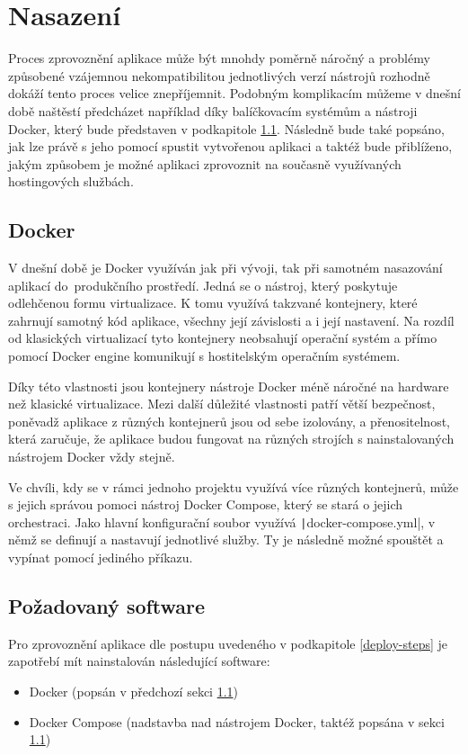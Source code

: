 \chapter{Nasazení}
Proces zprovoznění aplikace může být mnohdy poměrně náročný a problémy způsobené vzájemnou nekompatibilitou jednotlivých verzí nástrojů rozhodně dokáží tento proces velice znepříjemnit. Podobným komplikacím můžeme v dnešní době naštěstí předcházet například díky balíčkovacím systémům a nástroji Docker, který bude představen v podkapitole \ref{docker}. Následně bude také popsáno, jak lze právě s jeho pomocí spustit vytvořenou aplikaci a taktéž bude přiblíženo, jakým způsobem je možné aplikaci zprovoznit na současně využívaných hostingových službách.

\section{Docker}\label{docker}
V dnešní době je Docker využíván jak při vývoji, tak při samotném nasazování aplikací do~produkčního prostředí. Jedná se o nástroj, který poskytuje odlehčenou formu virtualizace. K tomu využívá takzvané kontejnery, které zahrnují samotný kód aplikace, všechny její závislosti a i její nastavení. Na rozdíl od klasických virtualizací tyto kontejnery neobsahují operační systém a přímo pomocí Docker engine komunikují s hostitelským operačním systémem. \cite{docker}

Díky této vlastnosti jsou kontejnery nástroje Docker méně náročné na hardware než klasické virtualizace. Mezi další důležité vlastnosti patří větší bezpečnost, poněvadž aplikace z různých kontejnerů jsou od sebe izolovány, a přenositelnost, která zaručuje, že aplikace budou fungovat na různých strojích s nainstalovaných nástrojem Docker vždy stejně. \cite{docker}

Ve chvíli, kdy se v rámci jednoho projektu využívá více různých kontejnerů, může s jejich správou pomoci nástroj Docker Compose, který se stará o jejich orchestraci. Jako hlavní konfigurační soubor využívá \texttt|docker-compose.yml|, v němž se definují a nastavují jednotlivé služby. Ty je následně možné spouštět a vypínat pomocí jediného příkazu.

\section{Požadovaný software}
Pro zprovoznění aplikace dle postupu uvedeného v podkapitole \ref{deploy-steps} je zapotřebí mít nainstalován následující software:
\begin{itemize}
	\item Docker (popsán v předchozí sekci \ref{docker})
	\item Docker Compose (nadstavba nad nástrojem Docker, taktéž popsána v sekci \ref{docker})
\end{itemize}

